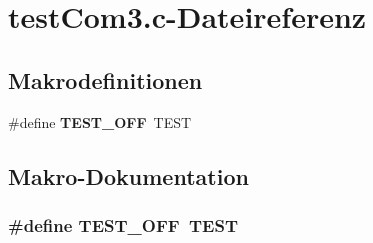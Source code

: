 \section{testCom3.c-\/Dateireferenz}
\label{test_com3_8c}
\subsection*{Makrodefinitionen}
\begin{DoxyCompactItemize}
\item 
\#define {\bf TEST\_\-OFF}~TEST
\end{DoxyCompactItemize}


\subsection{Makro-\/Dokumentation}
\subsubsection[{TEST\_\-OFF}]{\setlength{\rightskip}{0pt plus 5cm}\#define TEST\_\-OFF~TEST}\label{test_com3_8c_a8f6764e8e57eabbb14922404c0e25175}
